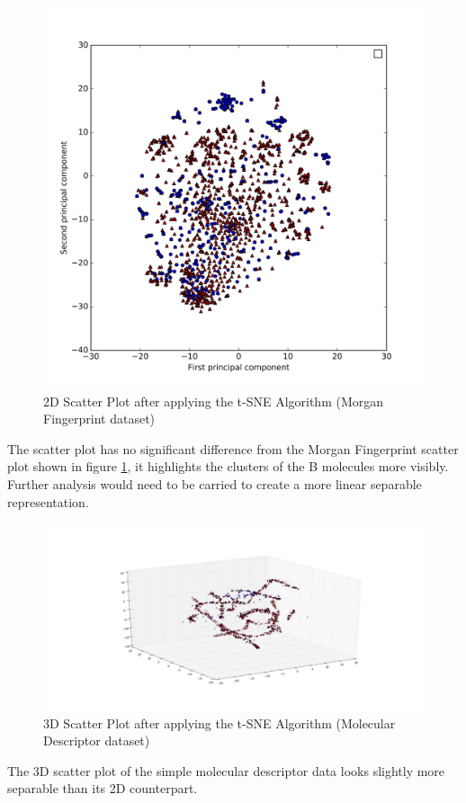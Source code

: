 \documentclass[a4paper,12pt]{report}
\begin{document}
		\begin{figure}[H]
			\centering
			\includegraphics[width=\textwidth,scale=1,totalheight=0.5\textheight]{images/scatter_tsne_mfps}
			\caption{2D Scatter Plot after applying the t-SNE Algorithm (Morgan Fingerprint dataset)}
			\label{fig:scatter_tsne_mfps_2D}
		\end{figure}
		The scatter plot has no significant difference from the Morgan Fingerprint scatter plot shown in figure \ref{fig:scatter_tsne_mfps_2D}, it highlights the clusters of the B molecules more visibly. Further analysis would need to be carried to create a more linear separable representation.
		\begin{figure}[H]
			\centering
			\includegraphics[width=\textwidth,scale=1,totalheight=0.5\textheight]{images/scatter_tsne_3D}
			\caption{3D Scatter Plot after applying the t-SNE Algorithm (Molecular Descriptor dataset)}
			\label{fig:scatter_tsne_3D}
		\end{figure}
		The 3D scatter plot of the simple molecular descriptor data looks slightly more separable than its 2D counterpart.
		
\end{document}
